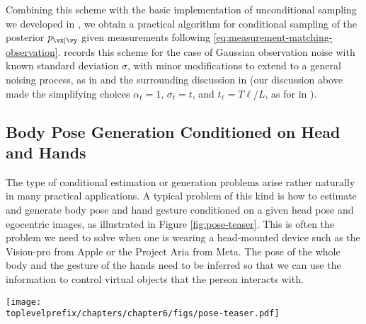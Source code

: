 \documentclass[../../book-main.tex]{subfiles}
\begin{document}
Combining this scheme with the basic implementation of unconditional sampling we
developed in , we obtain a practical algorithm for
conditional sampling of the posterior $p_{\vx \mid \vy}$ given measurements
following \eqref{eq:measurement-matching-observation}.
 records this scheme
for the case of
Gaussian observation noise with known standard deviation $\sigma$, with minor
modifications to extend to a general noising process, as in
 and the surrounding discussion in
 (our discussion above made the simplifying choices $\alpha_t = 1$, $\sigma_t = t$, and
$t_{\ell} = T\ell / L$, as for  in
).



\subsection{Body Pose Generation Conditioned on Head and Hands}\label{sub:ego-allo}
The type of
conditional estimation or generation problems arise rather naturally in many
practical applications. 
A typical problem of this kind is how to estimate and generate body pose and hand gesture conditioned on a given head pose and egocentric images, as illustrated in Figure \ref{fig:pose-teaser}. This is often the problem we need to solve when one is wearing a head-mounted device such as the Vision-pro from Apple or the Project Aria from Meta. The pose of the whole body and the gesture of the hands need to be inferred so that we can use the information to control virtual objects that the person interacts with.
\begin{figure*}[t]
  \centering
  \texttt{[image: \\toplevelprefix/chapters/chapter6/figs/pose-teaser.pdf]}
    \caption{
A system that estimates human body height, pose,  and hand parameters (middle), conditioned on ego-centric SLAM poses and images (left). Outputs capture the wearer's actions in the allocentric reference frame of the scene, which we visualize here with 3D reconstructions (right).
  }
  \label{fig:pose-teaser}

\end{figure*}
\end{document}
